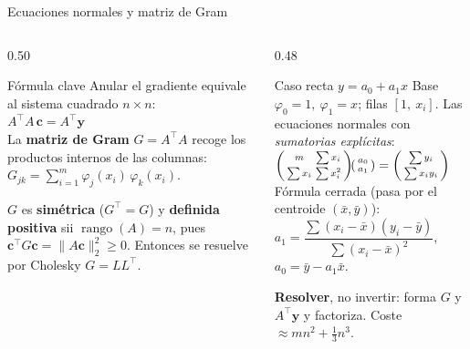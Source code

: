 \documentclass[aspectratio=169,10pt]{beamer}
\begin{document}
\begin{frame}{Ecuaciones normales y matriz de Gram}
\begin{columns}[T]
\begin{column}{0.50\textwidth}
\begin{cardidea}{Fórmula clave}{\faSuperscript}
{\footnotesize Anular el gradiente equivale al sistema cuadrado $n\times n$:\\[0.6mm]
$\boxed{A^{\!\top}\!A\,\mathbf c=A^{\!\top}\mathbf y}$\\[1.2mm]
La \textbf{matriz de Gram} $G=A^{\!\top}\!A$ recoge los productos internos de las columnas:\\[0.3mm]
$G_{jk}=\displaystyle\sum_{i=1}^m\varphi_j(x_i)\,\varphi_k(x_i)$.}
\end{cardidea}
\vspace{1mm}
\begin{cardnota}[\faCheckCircle]
{\footnotesize $G$ es \textbf{simétrica} ($G^{\!\top}=G$) y \textbf{definida positiva} sii $\operatorname{rango}(A)=n$, pues $\mathbf c^{\!\top}G\mathbf c=\|A\mathbf c\|_2^2\ge0$. Entonces se resuelve por Cholesky $G=LL^{\!\top}$.}
\end{cardnota}
\end{column}
\begin{column}{0.48\textwidth}
\begin{cardgear}{Caso recta $y=a_0+a_1x$}{\faCalculator}
{\footnotesize Base $\varphi_0=1,\ \varphi_1=x$; filas $[1,\ x_i]$. Las ecuaciones normales con \emph{sumatorias explícitas}:\\[1.0mm]
$\begin{psmallmatrix} m & \sum x_i\\[1pt] \sum x_i & \sum x_i^2\end{psmallmatrix}\!\begin{psmallmatrix}a_0\\[1pt] a_1\end{psmallmatrix}=\begin{psmallmatrix}\sum y_i\\[1pt] \sum x_iy_i\end{psmallmatrix}$\\[1.6mm]
Fórmula cerrada (pasa por el centroide $(\bar x,\bar y)$):\\[0.4mm]
$a_1=\dfrac{\sum(x_i-\bar x)(y_i-\bar y)}{\sum(x_i-\bar x)^2}$, \; $a_0=\bar y-a_1\bar x$.}
\end{cardgear}
\vspace{1mm}
\begin{cardnota}[\faExclamationTriangle]
{\footnotesize \textbf{Resolver}, no invertir: forma $G$ y $A^{\!\top}\mathbf y$ y factoriza. Coste $\approx mn^2+\tfrac13 n^3$.}
\end{cardnota}
\end{column}
\end{columns}
\end{frame}
\end{document}
